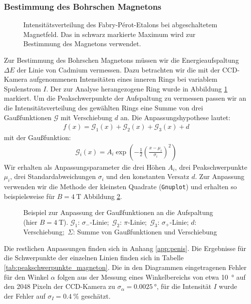 \documentclass[11pt, a4paper]{article}
\begin{document}
\FloatBarrier
\subsubsection{Bestimmung des Bohrschen Magnetons}
\label{sssec:magneton}
\begin{figure}[h]
	\centering
	
	\caption{Intensitätsverteilung des Fabry-Pérot-Etalons bei abgeschaltetem Magnetfeld. Das in schwarz markierte Maximum wird zur Bestimmung des Magnetons verwendet.}
	\label{fig:peakauswahl}
\end{figure}
Zur Bestimmung des Bohrschen Magnetons müssen wir die Energieaufspaltung $\Delta E$ der Linie von Cadmium vermessen.
Dazu betrachten wir die mit der CCD-Kamera aufgenommenen Intensitäten eines inneren Rings bei variablem Spulenstrom $I$.
Der zur Analyse herangezogene Ring wurde in Abbildung \ref{fig:peakauswahl} markiert.
Um die Peakschwerpunkte der Aufspaltung zu vermessen passen wir an die Intensitätsverteilung des gewählten Rings eine Summe von drei Gaußfunktionen $\mathcal{G}$ mit Verschiebung $d$ an.
Die Anpassungshypothese lautet:
\begin{align*}
f(x) = \mathcal{G}_1(x) + \mathcal{G}_2(x) + \mathcal{G}_3(x) + d
\end{align*}
mit der Gaußfunktion:
\begin{align*}
\mathcal{G}_i(x) = A_i \exp\left( -\frac{1}{2} \left( \frac{x - \mu_i}{\sigma_i} \right)^2 \right)
\end{align*}
Wir erhalten als Anpassungsparameter die drei Höhen $A_i$, drei Peakschwerpunkte $\mu_i$, drei Standardabweichungen $\sigma_i$ und den konstanten Versatz $d$.
Zur Anpassung verwenden wir die Methode der kleinsten Quadrate (\texttt{Gnuplot}) und erhalten so beispielsweise für $B = \SI{4}{\tesla}$ Abbildung \ref{fig:zeeman_b4_bsp}.
\begin{figure}[h]
	\centering
	
	\caption{Beispiel zur Anpassung der Gaußfunktionen an die Aufspaltung (hier $B = \SI{4}{\tesla}$). $\mathcal{G}_1$: $\sigma_-$-Linie;\, $\mathcal{G}_2$: $\pi$-Linie;\, $\mathcal{G}_3$: $\sigma_+$-Linie; $d$: Verschiebung;\, $\Sigma$: Summe von Gaußfunktionen und Verschiebung}
	\label{fig:zeeman_b4_bsp}
\end{figure}
Die restlichen Anpassungen finden sich in Anhang \ref{app:penis}.
Die Ergebnisse für die Schwerpunkte der einzelnen Linien finden sich in Tabelle \ref{tab:peakschwerpunkte_magneton}.
Die in den Diagrammen eingetragenen Fehler für den Winkel $\alpha$ folgen aus der Messung eines Winkelbereichs von etwa \SI{10}{\degree} auf den \num{2048} Pixeln der CCD-Kamera zu $\sigma_\alpha = \SI{0.0025}{\degree}$, für die Intensität $I$ wurde der Fehler auf $\sigma_I = \SI{0.4}{\percent}$ geschätzt.
\end{document}

